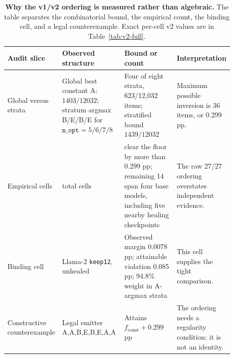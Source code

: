 \begin{table}[!htbp]
\centering
\small
\setlength{\tabcolsep}{3.2pt}
\begin{tabular}{>{\raggedright\arraybackslash}p{0.18\linewidth}>{\raggedright\arraybackslash}p{0.28\linewidth}>{\raggedright\arraybackslash}p{0.25\linewidth}>{\raggedright\arraybackslash}p{0.19\linewidth}}
\toprule
Audit slice & Observed structure & Bound or count & Interpretation \\
\midrule
Global versus strata & Global best constant A: $1403/12032$; stratum argmax B/E/B/E for $\texttt{n\_opt}=5/6/7/8$ & Four of eight strata, 623/12,032 items; stratified bound $1439/12032$ & Maximum possible inversion is 36 items, or 0.299 pp. \\
Empirical cells & 27 total cells & 13 clear the floor by more than 0.299 pp; remaining 14 span four base models, including five nearby healing checkpoints & The raw 27/27 ordering overstates independent evidence. \\
Binding cell & Llama-2 \texttt{keep12}, unhealed & Observed margin 0.0078 pp; attainable violation 0.085 pp; 94.8\% weight in A-argmax strata & This cell supplies the tight comparison. \\
Constructive counterexample & Legal emitter A,A,B,E,B,E,A,A & Attains $f_{\mathrm{const}}+0.299$ pp & The ordering needs a regularity condition; it is not an identity. \\
\bottomrule
\end{tabular}
\caption{\textbf{Why the v1/v2 ordering is measured rather than algebraic.} The table separates the combinatorial bound, the empirical count, the binding cell, and a legal counterexample. Exact per-cell v2 values are in Table~\ref{tab:v2-full}.}
\label{tab:ordering-audit}
\end{table}
